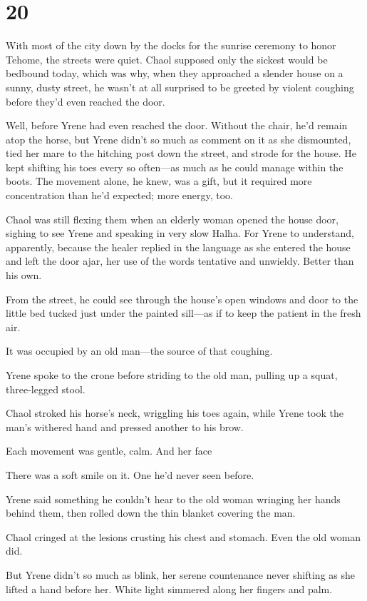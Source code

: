 
\chapter{20}

With most of the city down by the docks for the sunrise ceremony to honor Tehome, the streets were quiet. Chaol supposed only the sickest would be bedbound today, which was why, when they approached a slender house on a sunny, dusty street, he wasn't at all surprised to be greeted by violent coughing before they'd even reached the door.

Well, before Yrene had even reached the door. Without the chair, he'd remain atop the horse, but Yrene didn't so much as comment on it as she dismounted, tied her mare to the hitching post down the street, and strode for the house. He kept shifting his toes every so often---as much as he could manage within the boots. The movement alone, he knew, was a gift, but it required more concentration than he'd expected; more energy, too.

Chaol was still flexing them when an elderly woman opened the house door, sighing to see Yrene and speaking in very slow Halha. For Yrene to understand, apparently, because the healer replied in the language as she entered the house and left the door ajar, her use of the words tentative and unwieldy. Better than his own.

From the street, he could see through the house's open windows and door to the little bed tucked just under the painted sill---as if to keep the patient in the fresh air.

It was occupied by an old man---the source of that coughing.

Yrene spoke to the crone before striding to the old man, pulling up a squat, three-legged stool.

Chaol stroked his horse's neck, wriggling his toes again, while Yrene took the man's withered hand and pressed another to his brow.

Each movement was gentle, calm. And her face 

There was a soft smile on it. One he'd never seen before.

Yrene said something he couldn't hear to the old woman wringing her hands behind them, then rolled down the thin blanket covering the man.

Chaol cringed at the lesions crusting his chest and stomach. Even the old woman did.

But Yrene didn't so much as blink, her serene countenance never shifting as she lifted a hand before her. White light simmered along her fingers and palm.

